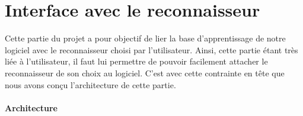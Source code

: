 \section{Interface avec le reconnaisseur}

Cette partie du projet a pour objectif de lier la base d'apprentissage de notre logiciel avec le reconnaisseur choisi par l'utilisateur. Ainsi, cette partie étant très liée à l'utilisateur, il faut lui permettre de pouvoir facilement attacher le reconnaisseur de son choix au logiciel. C'est avec cette contrainte en tête que nous avons conçu l'architecture de cette partie.



\paragraph{Architecture}

